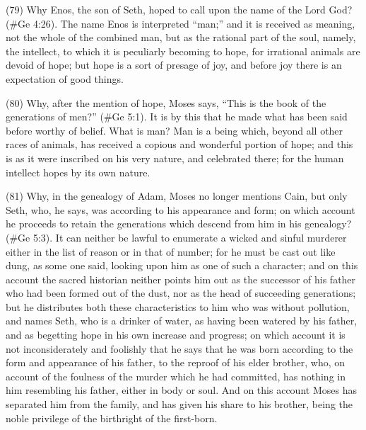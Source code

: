 (79) Why Enos, the son of Seth, hoped to call upon the name of the Lord God? (\#Ge 4:26).
The name Enos is interpreted ``man;'' and it is received as meaning, not the whole of the combined
man, but as the rational part of the soul, namely, the intellect, to which it is peculiarly becoming to
hope, for irrational animals are devoid of hope; but hope is a sort of presage of joy, and before joy
there is an expectation of good things.

(80) Why, after the mention of hope, Moses says, ``This is the book of the generations of men?''
(\#Ge 5:1). It is by this that he made what has been said before worthy of belief. What is man?
Man is a being which, beyond all other races of animals, has received a copious and wonderful
portion of hope; and this is as it were inscribed on his very nature, and celebrated there; for the
human intellect hopes by its own nature.

(81) Why, in the genealogy of Adam, Moses no longer mentions Cain, but only Seth, who, he says,
was according to his appearance and form; on which account he proceeds to retain the
generations which descend from him in his genealogy? (\#Ge 5:3). It can neither be lawful to
enumerate a wicked and sinful murderer either in the list of reason or in that of number; for he must
be cast out like dung, as some one said, looking upon him as one of such a character; and on this
account the sacred historian neither points him out as the successor of his father who had been
formed out of the dust, nor as the head of succeeding generations; but he distributes both these
characteristics to him who was without pollution, and names Seth, who is a drinker of water, as
having been watered by his father, and as begetting hope in his own increase and progress; on
which account it is not inconsiderately and foolishly that he says that he was born according to the
form and appearance of his father, to the reproof of his elder brother, who, on account of the
foulness of the murder which he had committed, has nothing in him resembling his father, either in
body or soul. And on this account Moses has separated him from the family, and has given his
share to his brother, being the noble privilege of the birthright of the first-born.

